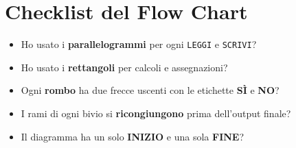 \section{Checklist del Flow Chart}

\begin{consiglio}
\begin{itemize}
  \item[$\square$] Ho usato i \textbf{parallelogrammi} per ogni \texttt{LEGGI} e \texttt{SCRIVI}?
  \item[$\square$] Ho usato i \textbf{rettangoli} per calcoli e assegnazioni?
  \item[$\square$] Ogni \textbf{rombo} ha due frecce uscenti con le etichette \textbf{SÌ} e \textbf{NO}?
  \item[$\square$] I rami di ogni bivio si \textbf{ricongiungono} prima dell'output finale?
  \item[$\square$] Il diagramma ha un solo \textbf{INIZIO} e una sola \textbf{FINE}?
\end{itemize}
\end{consiglio}
